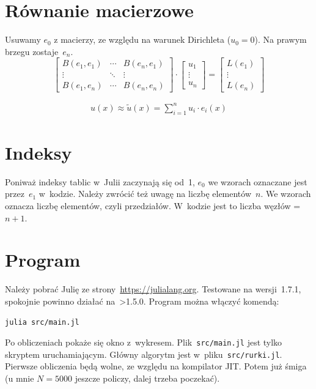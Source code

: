 \documentclass[12pt,a4paper]{mwart}
\begin{document}
\section{Równanie macierzowe}
Usuwamy $e_0$ z macierzy, ze względu na warunek Dirichleta
($u_0 = 0$).
Na prawym brzegu zostaje~$e_n$.
\begin{equation*}
    \left[
    \begin{matrix}
        B(e_1, e_1) & \cdots & B(e_n, e_1) \\
        \vdots      & \ddots & \vdots \\
        B(e_1, e_n) & \cdots & B(e_n, e_n)
    \end{matrix}
    \right]
    \cdot
    \left[
    \begin{matrix}
        u_1 \\
        \vdots \\
        u_n
    \end{matrix}
    \right]
    =
    \left[
    \begin{matrix}
        L(e_1) \\
        \vdots \\
        L(e_n)
    \end{matrix}
    \right]
\end{equation*}

\begin{align*}
    u(x) \approx \tilde{u}(x) = \sum_{i=1}^n u_i \cdot e_i(x)
\end{align*}

\section{Indeksy}
Poniważ indeksy tablic w~Julii zaczynają się od~1,
$e_0$ we wzorach oznaczane jest przez~$e_1$ w~kodzie.
Należy zwrócić też uwagę na liczbę elementów~$n$.
We wzorach oznacza liczbę elementów, czyli przedziałów.
W~kodzie jest to liczba węzłów = $n+1$.

\section{Program}
Należy pobrać Julię ze strony~\url{https://julialang.org}.
Testowane na wersji~1.7.1, spokojnie powinno działać na~>1.5.0.
Program można włączyć komendą:
\begin{verbatim}
julia src/main.jl
\end{verbatim}
Po obliczeniach pokaże się okno z~wykresem.
Plik~\verb|src/main.jl| jest tylko skryptem
uruchamiającym.
Główny algorytm jest w~pliku~\verb|src/rurki.jl|.
Pierwsze obliczenia będą wolne, ze względu
na kompilator JIT. Potem już śmiga
(u mnie $N=5000$ jeszcze policzy, dalej trzeba poczekać).
\end{document}
